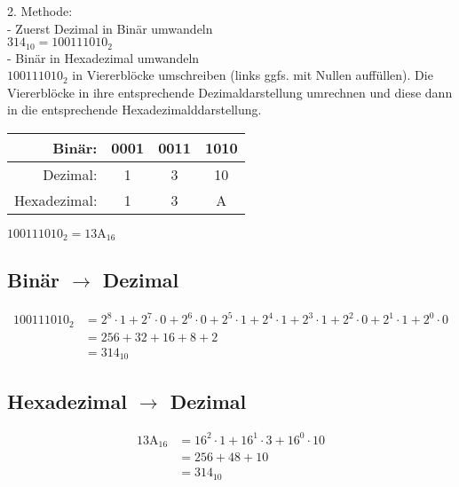 2. Methode:\\

- Zuerst Dezimal in Binär umwandeln\\

$314_{10} = 100111010_2$\\

- Binär in Hexadezimal umwandeln\\

$1 0011 1010_2$ in Viererblöcke umschreiben (links ggfs. mit Nullen auffüllen). Die Viererblöcke in ihre entsprechende Dezimaldarstellung umrechnen und diese dann in die entsprechende Hexadezimalddarstellung.

\begin{table}[h]
\begin{tabular}{|r||c|c|c|}
\hline
Binär: & 0001 & 0011 & 1010\\
\hline
Dezimal: & 1 & 3 & 10\\
\hline
Hexadezimal: & 1& 3 & A\\
\hline
\end{tabular}
\end{table}

$100111010_2 = \text{13A}_{16}$

\subsection{Binär $\rightarrow$ Dezimal}

\begin{align*}
100111010_2 &= 2^{8} \cdot 1 + 2^{7} \cdot 0 + 2^{6} \cdot 0 + 2^{5} \cdot 1 + 2^{4} \cdot 1 + 2^{3} \cdot 1 + 2^{2} \cdot 0 + 2^{1} \cdot 1 + 2^{0} \cdot 0\\
&= 256 + 32 + 16 + 8 + 2\\
&= 314_{10}
\end{align*}

\subsection{Hexadezimal $\rightarrow$ Dezimal}

\begin{align*}
\text{13A}_{16} &= 16^2 \cdot 1 + 16^1 \cdot 3 + 16^0 \cdot 10\\
&= 256 + 48 + 10\\
&= 314_{10}
\end{align*}



